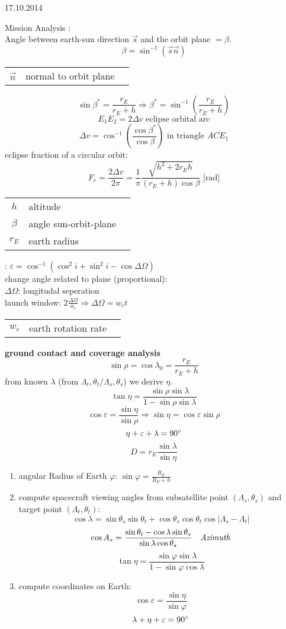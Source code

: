 \begin{chapter}{17.10.2014}
\begin{section}{Mission Analysis}
 \textbf{}:\\
 Angle between earth-sun direction $\vec{s}$ and the orbit plane $=\beta$.
 \[ \beta = \sin^{-1}(\vec{s}\vec{n}) \]
 \begin{tabular}{c|l|c}
  $\vec{n}$ & normal to orbit plane & 
 \end{tabular}
 \[\sin \beta^* = \frac{r_E}{r_E +h} \Rightarrow \beta^* = \sin^{-1}\left(\frac{r_E}{r_E +h}\right) \]
 \[ E_1E_2 = 2\Delta v \text{   eclipse orbital arc}\]
 \[\Delta v = \cos^{-1}\left(\frac{\cos \beta^*}{\cos \beta}\right)\text{   in triangle }ACE_1 \]
 eclipse fraction of a circular orbit:
 \[ F_e = \frac{2\Delta v}{2\pi} = \frac{1}{\pi}\frac{\sqrt{h^2+2r_E h}}{(r_E+h)\cos\beta} \text{   [rad]}\]
 \begin{tabular}{c|l|c}
  $h$ & altitude & \\
  $\beta$ & angle sun-orbit-plane& \\
  $r_E$ & earth radius & 
 \end{tabular}
 
  : $\varepsilon = \cos^{-1}(\cos^2 i + \sin^2 i -\cos \Delta \Omega)$\\
  change angle related to plane (proportional):\\
  $\Delta \Omega$: longitudal seperation\\
  launch window: $2\frac{\Delta\Omega}{w_c} \Rightarrow \Delta\Omega = w_c t$
  \begin{tabular}{c|l|c}
   $w_c$ & earth rotation rate & 
  \end{tabular}

  \textbf{ground contact and coverage analysis}
  \[\sin \rho = \cos \lambda_0 = \frac{r_E}{r_E+h}\]
  from known $\lambda$ (from $\Lambda_t, \theta_t / \Lambda_s, \theta_s$) we derive $\eta$.
  \[ \tan\eta = \frac{\sin\rho\sin\lambda}{1-\sin\rho\sin\lambda} \]
  \[ \cos\varepsilon = \frac{\sin\eta}{\sin\rho} \Rightarrow \sin\eta = \cos\varepsilon\sin\rho\]
  \[ \eta+\varepsilon+\lambda = 90\degree \]
  \[D =r_E \frac{\sin\lambda}{\sin\eta}\]
  
  \begin{enumerate}[1)]
 \item angular Radius of Earth $\varphi$: $\sin \varphi = \frac{R_E}{R_E+h}$
 \item compute spacecraft viewing angles from subsatellite point $(\Lambda_s,\theta_s)$ and target point $(\Lambda_t,\theta_t)$:
 \[\cos \lambda = \sin\theta_s \sin\theta_t+\cos\theta_s \cos\theta_t \cos |\Lambda_s-\Lambda_t|\]
 \[\cos A_z = \frac{\sin\theta_t-\cos\lambda\sin\theta_s}{\sin\lambda\cos\theta_s} ~~~\text{\indexx{Azimuth}}\]
 \[\tan \eta = \frac{\sin \varphi \sin \lambda}{1-\sin \varphi \cos \lambda}\]
 \item compute coordinates on Earth:
 \[\cos \varepsilon = \frac{\sin\eta}{\sin\varphi}\]
 \[\lambda + \eta+\varepsilon = 90 \degree\]
\end{enumerate}
  \end{section}
\end{chapter}